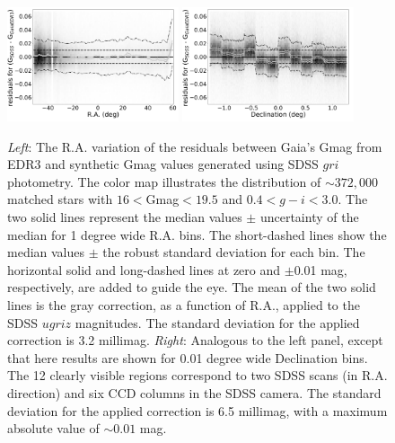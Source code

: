 \documentclass[fleqn,usenatbib]{mnras}
\begin{document}
\begin{figure}
  \centering\includegraphics[width=0.45\textwidth]{figures/GmagCorrection_RA_Hess.png} 
  \centering\includegraphics[width=0.45\textwidth]{figures/GmagCorrection_Dec_Hess.png} 
\caption{{\it Left}: The R.A. variation of the residuals between Gaia's Gmag from EDR3
and synthetic Gmag values generated using SDSS $gri$ photometry. The 
color map illustrates the distribution of $\sim 372,000$ matched stars with 
$16<$Gmag$<19.5$ and $0.4 < g-i < 3.0$. The two solid lines represent the 
median values $\pm$ uncertainty of the median for 1 degree wide R.A. bins. 
The short-dashed lines show the median values $\pm$ the robust standard 
deviation for each bin. The horizontal solid and long-dashed lines at zero and 
$\pm$0.01 mag, respectively, are added to guide the eye. The mean of the two 
solid lines is the gray correction, as a function of R.A., applied to the SDSS 
$ugriz$ magnitudes. The standard deviation for the applied correction is 3.2 millimag.
{\it Right}: Analogous to the left panel, except that here results are shown for
0.01 degree wide Declination bins. The 12 clearly visible regions correspond to
two SDSS scans (in R.A. direction) and six CCD columns in the SDSS camera. 
The standard deviation for the applied correction is 6.5 millimag, with a maximum
absolute value of $\sim0.01$ mag.}
\label{fig:graycorrRA}
\end{figure}

\end{document}
